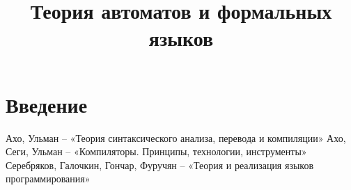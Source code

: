 \documentclass[a4paper]{report}
\title{Теория автоматов и формальных языков}
\begin{document}
  \maketitle
  \tableofcontents
  \newpage
  
  \chapter{Введение}
  
  
  
  \begin{thebibliography}{}
      Ахо, Ульман  --  «Теория синтаксического анализа, перевода и компиляции»
      Ахо, Сеги, Ульман  --  «Компиляторы. Принципы, технологии, инструменты»
      Серебряков, Галочкин, Гончар, Фуручян  --  «Теория и реализация языков программирования»
  \end{thebibliography}
\end{document}
